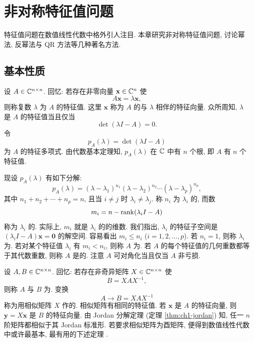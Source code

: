 \chapter{非对称特征值问题}
\label{ch:nonsym-eig}

特征值问题在数值线性代数中格外引人注目. 本章研究非对称特征值问题, 讨论幂法, 反幂法与 QR 方法等几种著名方法.

\section{基本性质}
\label{sec:7-1}

设 $A\in\mathbb{C}^{n\times n}$. 回忆: 若存在非零向量 $\mathbf{x}\in\mathbb{C}^n$ 使
\[
  A\mathbf{x}=\lambda\mathbf{x},
\]
则称复数 $\lambda$ 为 $A$ 的特征值. 这里 $\mathbf{x}$ 称为 $A$ 的与 $\lambda$ 相伴的特征向量. 众所周知, $\lambda$ 是 $A$ 的特征值当且仅当
\[
  \det(\lambda I-A)=0.
\]
令
\[
  p_A(\lambda)=\det(\lambda I-A)
\]
为 $A$ 的特征多项式. 由代数基本定理知, $p_A(\lambda)$ 在 $\mathbb{C}$ 中有 $n$ 个根, 即 $A$ 有 $n$ 个特征值.

现设 $p_A(\lambda)$ 有如下分解:
\[
  p_A(\lambda)=(\lambda-\lambda_1)^{n_1}(\lambda-\lambda_2)^{n_2}\cdots(\lambda-\lambda_p)^{n_p},
\]
其中 $n_1+n_2+\cdots+n_p=n$, 且当 $i\neq j$ 时 $\lambda_i\neq\lambda_j$. 称 $n_i$ 为 $\lambda_i$ 的, 而数
\[
  m_i=n-\operatorname{rank}(\lambda_i I-A)
\]
称为 $\lambda_i$ 的. 实际上, $m_i$ 就是 $\lambda_i$ 的的维数. 我们指出, $\lambda_i$ 的特征子空间是 $(\lambda_i I-A)\mathbf{x}=\mathbf{0}$ 的解空间. 容易看出 $m_i\leqslant n_i$ ($i=1,2,\ldots,p$). 若 $n_i=1$, 则称 $\lambda_i$ 为. 若对某个特征值 $\lambda_i$ 有 $m_i<n_i$, 则称 $A$ 为. 若 $A$ 的每个特征值的几何重数都等于其代数重数, 则称 $A$ 是的. 注意 $A$ 可对角化当且仅当 $A$ 非亏损.

设 $A,B\in\mathbb{C}^{n\times n}$. 回忆: 若存在非奇异矩阵 $X\in\mathbb{C}^{n\times n}$ 使
\[
  B=XAX^{-1},
\]
则称 $A$ 与 $B$ 为. 变换
\[
  A\rightarrow B=XAX^{-1}
\]
称为用相似矩阵 $X$ 作的. 相似矩阵有相同的特征值. 若 $\mathbf{x}$ 是 $A$ 的特征向量, 则 $\mathbf{y}=X\mathbf{x}$ 是 $B$ 的特征向量. 由 Jordan 分解定理 (定理 \ref{thm:ch1-jordan}) 知, 任一 $n$ 阶矩阵都相似于其 Jordan 标准形. 若要求相似矩阵为酉矩阵, 便得到数值线性代数中或许最基本, 最有用的下述定理 \cite{src:39}.

